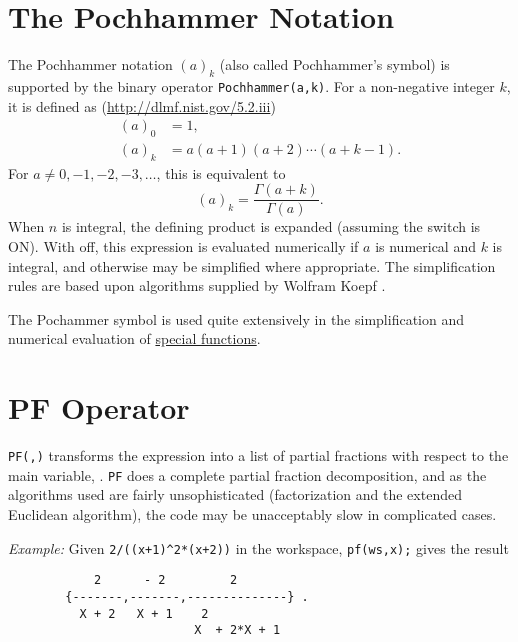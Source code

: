 \section{The Pochhammer Notation}
\hypertarget{POCH}{}
\hypertarget{operator:POCHHAMMER}{}
The Pochhammer notation $(a)_k$ (also called Pochhammer's symbol) is supported
by the binary operator \texttt{Pochhammer(a,k)}.
For a non-negative integer $k$, it is defined as
(\url{http://dlmf.nist.gov/5.2.iii})
\begin{align*}
  (a)_0 &= 1, \\
  (a)_k &= a(a+1)(a+2)\cdots(a+k-1).
\end{align*}
For $a \neq 0, -1, -2, -3, \ldots$, this is equivalent to
\[ (a)_k = \frac{\Gamma(a+k)}{\Gamma(a)}. \]
When $n$ is integral, the defining product is expanded (assuming the switch
 is ON). With  off, this expression is evaluated
numerically if $a$ is numerical and $k$ is integral, and otherwise may be
simplified where appropriate.  The simplification rules are based upon
algorithms supplied by Wolfram Koepf \cite{Koepf:92}.

The Pochammer symbol is used quite extensively in the simplification and
numerical evaluation of \hyperlink{SPECFNS}{special functions}.

\section{PF Operator}
\hypertarget{operator:PF}{}

\texttt{PF(,)} transforms the expression  into
a list of partial fractions with respect to the main variable, .
\texttt{PF}
does a complete partial fraction decomposition, and as the algorithms used
are fairly unsophisticated (factorization and the extended Euclidean
algorithm), the code may be unacceptably slow in complicated cases.

\textit{Example:}
Given \texttt{2/((x+1)\textasciicircum2*(x+2))} in the workspace,
\texttt{pf(ws,x);} gives the result
\begin{samepage}
\begin{verbatim}
            2      - 2         2
        {-------,-------,--------------} .
          X + 2   X + 1    2
                          X  + 2*X + 1
\end{verbatim}
\end{samepage}

